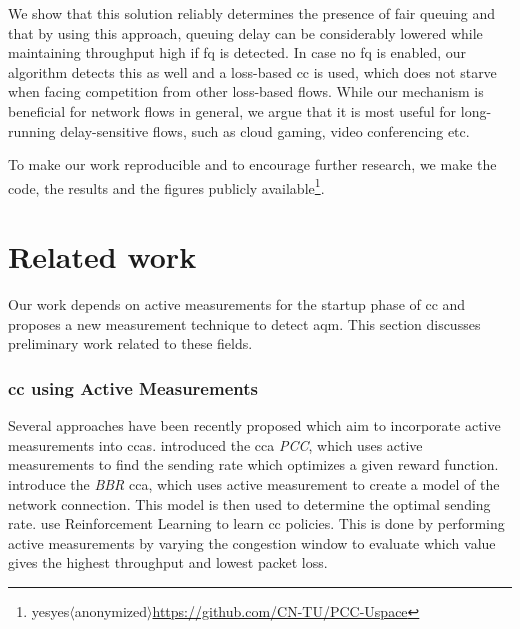 \documentclass[runningheads]{llncs}
\def\anonymize{yes}
\def\tempYes{yes}
\begin{document}
We show that this solution reliably determines the presence of fair queuing and that by using this approach, queuing delay can be considerably lowered while maintaining throughput high if \gls{fq} is detected. In case no \gls{fq} is enabled, our algorithm detects this as well and a loss-based \gls{cc} is used, which does not starve when facing competition from other loss-based flows. 
While our mechanism is beneficial for network flows in general, we argue that it is most useful for long-running delay-sensitive flows, such as cloud gaming, video conferencing etc. 

To make our work reproducible and to encourage further research, we make the code, the results and the figures publicly available\footnote{\ifx\anonymize\tempYes $\langle$anonymized$\rangle$\else\url{https://github.com/CN-TU/PCC-Uspace}\fi}. 

\section{Related work}
Our work depends on active measurements for the startup phase of \gls{cc} and proposes a new measurement technique to detect \gls{aqm}. This section discusses preliminary work related to these fields. 

\subsubsection{\gls{cc} using Active Measurements}
Several approaches have been recently proposed which aim to incorporate active measurements into \glspl{cca}. \cite{dong_pcc_2015,dong_pcc_2018} introduced the \gls{cca} \textit{PCC}, which uses active measurements to find the sending rate which optimizes a given reward function. \cite{cardwell_bbr:_2016} introduce the \textit{BBR} \gls{cca}, which uses active measurement to create a model of the network connection. This model is then used to determine the optimal sending rate. \cite{bachl_rax_2019} use Reinforcement Learning to learn \gls{cc} policies. This is done by performing active measurements by varying the congestion window to evaluate which value gives the highest throughput and lowest packet loss. 

\end{document}
